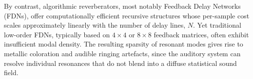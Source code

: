 \documentclass[12pt,a4paper]{article}
\begin{document}
By contrast, algorithmic reverberators, most notably Feedback Delay Networks (FDNs),
offer computationally efficient recursive structures whose per-sample cost scales
approximately linearly with the number of delay lines, $N$.
Yet traditional low-order FDNs, typically based on $4 \times 4$ or $8 \times 8$
feedback matrices, often exhibit insufficient modal density.
The resulting sparsity of resonant modes gives rise to metallic coloration and audible
ringing artefacts, since the auditory system can resolve individual resonances that do not
blend into a diffuse statistical sound field.






\clearpage
\end{document}
